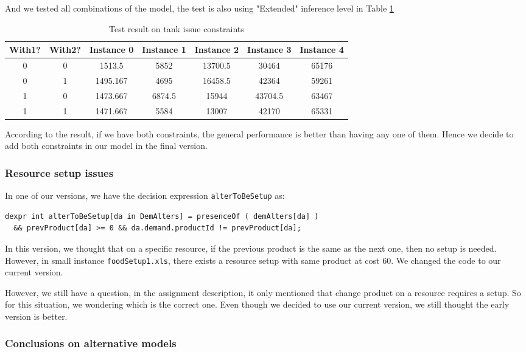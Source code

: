 \documentclass[a4paper, 12pt]{article}
\begin{document}
And we tested all combinations of the model, the test is also using "Extended" inference level in Table \ref{tankissue}
\begin{table}
    \centering
    \caption{Test result on tank issue constraints}
    \label{tankissue}
    \begin{tabular}{|c|c|c|c|c|c|c|}
    \hline
    With1? & With2? & Instance 0 & Instance 1 & Instance 2 & Instance 3 & Instance 4 \\
    \hline
    0 & 0 & 1513.5 & 5852 & 13700.5 & 30464 & 65176 \\
    \hline
    0 & 1 & 1495.167 & 4695 & 16458.5 & 42364 & 59261 \\
    \hline
    1 & 0 & 1473.667 & 6874.5 & 15944 & 43704.5 & 63467 \\
    \hline
    1 & 1 & 1471.667 & 5584 & 13007 & 42170 & 65331 \\
    \end{tabular}
\end{table}
According to the result, if we have both constraints, the general performance is better than having any one of them. Hence we decide to add both constraints in our model in the final version.

\subsubsection{Resource setup issues}

In one of our versions, we have the decision expression \texttt{alterToBeSetup} as: 

\begin{lstlisting}
dexpr int alterToBeSetup[da in DemAlters] = presenceOf ( demAlters[da] )
  && prevProduct[da] >= 0 && da.demand.productId != prevProduct[da];
\end{lstlisting}

In this version, we thought that on a specific resource, if the previous product is the same as the next one, then no setup is needed. However, in small instance \texttt{foodSetup1.xls}, there exists a resource setup with same product at cost 60. We changed the code to our current version. 

However, we still have a question, in the assignment description, it only mentioned that change product on a resource requires a setup. So for this situation, we wondering which is the correct one. Even though we decided to use our current version, we still thought the early version is better.

\subsubsection{Conclusions on alternative models}
\end{document}
